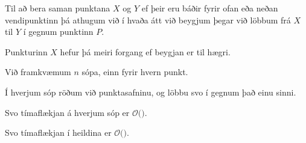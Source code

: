{
	{
		\item<1-> Til að bera saman punktana $X$ og $Y$ ef þeir eru báðir fyrir ofan eða neðan vendipunktinn þá athugum við í hvaða átt við beygjum
					þegar við löbbum frá $X$ til $Y$ í gegnum punktinn $P$.
		\item<2-> Punkturinn $X$ hefur þá meiri forgang ef beygjan er til hægri.
	}
}

{
}

{
}

{
	{
		\item<1-> Við framkvæmum $n$ sópa, einn fyrir hvern punkt.
		\item<2-> Í hverjum sóp röðum við punktasafninu, og löbbu svo í gegnum það einu sinni.
		\item<3-> Svo tímaflækjan á hverjum sóp er $\mathcal{O}($\onslide<4->{$n \log n$}$)$.
		\item<5-> Svo tímaflækjan í heildina er $\mathcal{O}($\onslide<6->{$n^2 \log n$}$)$.
	}
}

{
}


